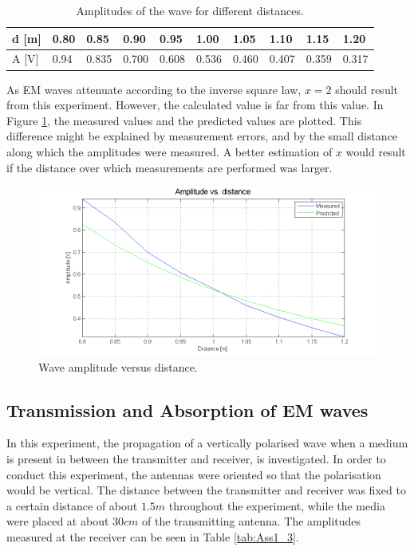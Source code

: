 \begin{table}[h]
\centering
\caption{Amplitudes of the wave for different distances.}
\label{tab:Ass1_2}
\begin{tabular}{l|lllllllll}
d {[}m{]} & 0.80 & 0.85  & 0.90  & 0.95  & 1.00  & 1.05  & 1.10  & 1.15  & 1.20  \\ \hline
A {[}V{]} & 0.94 & 0.835 & 0.700 & 0.608 & 0.536 & 0.460 & 0.407 & 0.359 & 0.317
\end{tabular}
\end{table}

As EM waves attenuate according to the inverse square law, $x=2$ should result from this experiment. However, the calculated value is far from this value. In Figure \ref{fig:Ass1_AvsD}, the measured values and the predicted values are plotted. This difference might be explained by measurement errors, and by the small distance along which the amplitudes were measured. A better estimation of $x$ would result if the distance over which measurements are performed was larger.

\begin{figure}[h]
    \centering
    \includegraphics[width=1\textwidth]{Session2_files/AvsD.png}
    \caption{Wave amplitude versus distance.}
    \label{fig:Ass1_AvsD}
\end{figure}

\subsection*{Transmission and Absorption of EM waves}

In this experiment, the propagation of a vertically polarised wave when a medium is present in between the transmitter and receiver, is investigated. In order to conduct this experiment, the antennas were oriented so that the polarisation would be vertical. The distance between the transmitter and receiver was fixed to a certain distance of about $1.5m$ throughout the experiment, while the media were placed at about $30cm$ of the transmitting antenna. The amplitudes measured at the receiver can be seen in Table \ref{tab:Ass1_3}.

